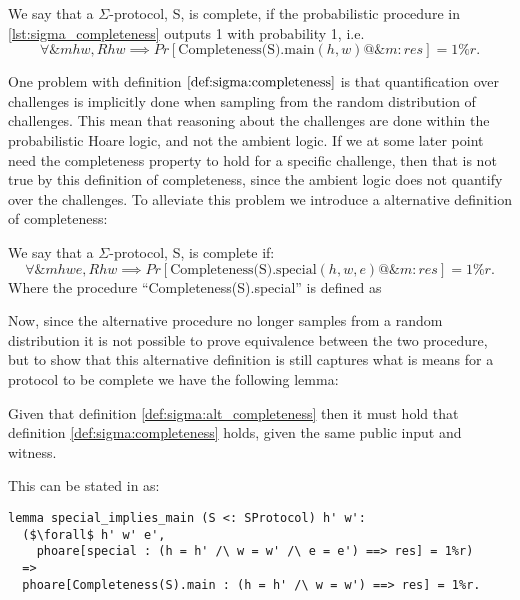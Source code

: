 \begin{definition}[Completeness]
\label{def:sigma:completeness}
  We say that a $\Sigma$-protocol, S, is complete, if the probabilistic procedure in
  \ref{lst:sigma_completeness} outputs 1 with probability 1, i.e.
  \begin{equation}
    \label{eq:sigma_completeness}
    \forall \&m h w, R h w \implies Pr[\text{Completeness(S).main}(h,w) @ \&m : res] = 1\%r.
  \end{equation}
\end{definition}

One problem with definition $\ref{def:sigma:completeness}$ is that
quantification over challenges is implicitly done when sampling from the random
distribution of challenges. This mean that reasoning about the challenges are
done within the probabilistic Hoare logic, and not the ambient logic. If we at
some later point need the completeness property to hold for a specific
challenge, then that is not true by this definition of completeness, since
the ambient logic does not quantify over the challenges. To alleviate this
problem we introduce a alternative definition of completeness:

\begin{definition}
\label{def:sigma:alt_completeness}
  We say that a $\Sigma$-protocol, S, is complete if:
  \begin{equation}
    \label{eq:sigma_completeness}
    \forall \&m h w e, R h w \implies Pr[\text{Completeness(S).special}(h,w,e) @ \&m : res] = 1\%r.
  \end{equation}
  Where the procedure ``Completeness(S).special'' is defined as
  
\end{definition}

Now, since the alternative procedure no longer samples from a random
distribution it is not possible to prove equivalence between the two procedure,
but to show that this alternative definition is still captures what is means for
a protocol to be complete we have the following lemma:

\begin{lemma}
Given that definition \ref{def:sigma:alt_completeness} then it must hold that
definition \ref{def:sigma:completeness} holds, given the same public input and witness.

This can be stated in \easycrypt as:
\begin{lstlisting}[mathescape]
lemma special_implies_main (S <: SProtocol) h' w':
  ($\forall$ h' w' e',
    phoare[special : (h = h' /\ w = w' /\ e = e') ==> res] = 1%r)
  =>
  phoare[Completeness(S).main : (h = h' /\ w = w') ==> res] = 1%r.
\end{lstlisting}
\end{lemma}

